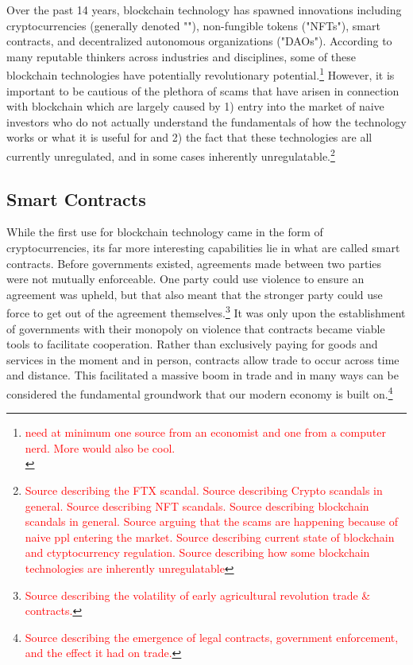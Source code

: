 \documentclass{article}[10pt]
\begin{document}
Over the past 14 years, blockchain technology has spawned innovations including cryptocurrencies (generally denoted "\textcent"), non-fungible tokens ("NFTs"), smart contracts, and decentralized autonomous organizations ("DAOs"). 
According to many reputable thinkers across industries and disciplines, some of these blockchain technologies have potentially revolutionary potential.\footnote{
    \textcolor{red}{need at minimum one source from an economist and one from a computer nerd. More would also be cool.}\\
    \indent \indent {}}
However, it is important to be cautious of the plethora of scams that have arisen in connection with blockchain which are largely caused by 1) entry into the market of naive investors who do not actually understand the fundamentals of how the technology works or what it is useful for and 2) the fact that these technologies are all currently unregulated, and in some cases inherently unregulatable.\footnote{
    \textcolor{red}{Source describing the FTX scandal. 
    Source describing Crypto scandals in general. 
    Source describing NFT scandals. 
    Source describing blockchain scandals in general. 
    Source arguing that the scams are happening because of naive ppl entering the market. 
    Source describing current state of blockchain and ctyptocurrency regulation. 
    Source describing how some blockchain technologies are inherently unregulatable}}


\subsection{Smart Contracts}
\label{subsection:smartContracts}
While the first use for blockchain technology came in the form of cryptocurrencies, its far more interesting capabilities lie in what are called smart contracts. 
Before governments existed, agreements made between two parties were not mutually enforceable. 
One party could use violence to ensure an agreement was upheld, but that also meant that the stronger party could use force to get out of the agreement themselves.\footnote{
    \textcolor{red}{Source describing the volatility of early agricultural revolution trade \& contracts.}}
It was only upon the establishment of governments with their monopoly on violence that contracts became viable tools to facilitate cooperation. 
Rather than exclusively paying for goods and services in the moment and in person, contracts allow trade to occur across time and distance.
This facilitated a massive boom in trade and in many ways can be considered the fundamental groundwork that our modern economy is built on.\footnote{
    \textcolor{red}{Source describing the emergence of legal contracts, government enforcement, and the effect it had on trade.}}\par 
    
\end{document}
